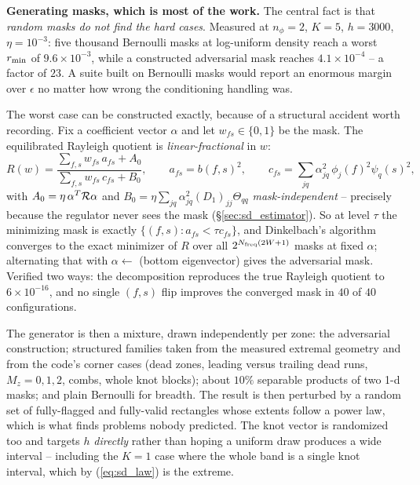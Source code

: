 \documentclass{article}
\numberwithin{equation}{section}   %
\begin{document}
{\bf Generating masks, which is most of the work.}  The central fact is that {\em random masks do not find the
hard cases}.  Measured at $n_\phi = 2$, $K = 5$, $h = 3000$, $\eta = 10^{-3}$: five thousand Bernoulli masks at
log-uniform density reach a worst $r_{\rm min}$ of $9.6\times10^{-3}$, while a constructed adversarial mask
reaches $4.1\times10^{-4}$ -- a factor of $23$.  A suite built on Bernoulli masks would report an enormous
margin over $\epsilon$ no matter how wrong the conditioning handling was.

The worst case can be constructed exactly, because of a structural accident worth recording.  Fix a coefficient
vector $\alpha$ and let $w_{fs} \in \{0,1\}$ be the mask.  The equilibrated Rayleigh quotient is
{\em linear-fractional} in $w$:
\begin{equation}
R(w) = \frac{\sum_{f,s} w_{fs}\,a_{fs} + A_0}{\sum_{f,s} w_{fs}\,c_{fs} + B_0},
\qquad
a_{fs} = b(f,s)^2,
\qquad
c_{fs} = \sum_{jq} \alpha_{jq}^2\,\phi_j(f)^2\psi_q(s)^2 ,
\label{eq:sd_dinkelbach}
\end{equation}
with $A_0 = \eta\,\alpha^T{\cal R}\alpha$ and $B_0 = \eta\sum_{jq}\alpha_{jq}^2 (D_1)_{jj}\Theta_{qq}$
{\em mask-independent} -- precisely because the regulator never sees the mask (\S\ref{sec:sd_estimator}).  So
at level $\tau$ the minimizing mask is exactly $\{(f,s) : a_{fs} < \tau c_{fs}\}$, and Dinkelbach's algorithm
converges to the exact minimizer of $R$ over all $2^{N_{\rm freq}(2W+1)}$ masks at fixed $\alpha$; alternating
that with $\alpha \leftarrow$ (bottom eigenvector) gives the adversarial mask.  Verified two ways: the
decomposition reproduces the true Rayleigh quotient to $6\times10^{-16}$, and no single $(f,s)$ flip improves
the converged mask in $40$ of $40$ configurations.

The generator is then a mixture, drawn independently per zone: the adversarial construction; structured
families taken from the measured extremal geometry and from the code's corner cases (dead zones, leading versus
trailing dead runs, $M_z = 0, 1, 2$, combs, whole knot blocks); about $10\%$ separable products of two 1-d
masks; and plain Bernoulli for breadth.  The result is then perturbed by a random set of fully-flagged and
fully-valid rectangles whose extents follow a power law, which is what finds problems nobody predicted.  The
knot vector is randomized too and targets $h$ {\em directly} rather than hoping a uniform draw produces a wide
interval -- including the $K=1$ case where the whole band is a single knot interval, which by
(\ref{eq:sd_law}) is the extreme.
\end{document}
